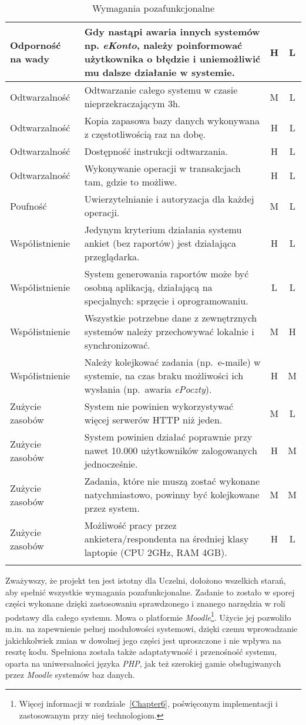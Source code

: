 \begin{center}
\begin{longtable}{ | p{4cm} | p{9cm} | c | c | }
%
Odporność na wady & Gdy nastąpi awaria innych systemów np. \textit{eKonto}, należy poinformować użytkownika o błędzie i uniemożliwić mu dalsze działanie w systemie. & H & L \\ \hline
%
Odtwarzalność & Odtwarzanie całego systemu w czasie nieprzekraczającym 3h. & M & L \\ \hline
Odtwarzalność & Kopia zapasowa bazy danych wykonywana z częstotliwością raz na dobę. & H & L \\ \hline
Odtwarzalność & Dostępność instrukcji odtwarzania. & H & L \\ \hline
Odtwarzalność & Wykonywanie operacji w transakcjach tam, gdzie to możliwe. & H & L \\ \hline
%
Poufność & Uwierzytelnianie i autoryzacja dla każdej operacji. & M & L \\ \hline
%
Współistnienie & Jedynym kryterium działania systemu ankiet (bez raportów) jest działająca przeglądarka. & H & L \\ \hline
Współistnienie & System generowania raportów może być osobną aplikacją, działającą na specjalnych: sprzęcie i oprogramowaniu. & L & L \\ \hline
Współistnienie & Wszystkie potrzebne dane z zewnętrznych systemów należy przechowywać lokalnie i synchronizować. & M & H \\ \hline
Współistnienie & Należy kolejkować zadania (np.~e-maile) w systemie, na czas braku możliwości ich wysłania (np.~awaria \textit{ePoczty}). & H & M \\ \hline
%
Zużycie zasobów & System nie powinien wykorzystywać więcej serwerów HTTP niż jeden. & M & L \\ \hline
Zużycie zasobów & System powinien działać poprawnie przy nawet 10.000 użytkowników zalogowanych jednocześnie. & H & M \\ \hline
Zużycie zasobów & Zadania, które nie muszą zostać wykonane natychmiastowo, powinny być kolejkowane przez system. & M & M \\ \hline
Zużycie zasobów & Możliwość pracy przez ankietera\slash respondenta na średniej klasy laptopie (CPU 2GHz, RAM 4GB). & H & L \\ \hline
%
\caption{Wymagania pozafunkcjonalne}\label{tab:reqs}
\end{longtable}
\end{center}

Zważywszy, że projekt ten jest istotny dla Uczelni, dołożono wszelkich starań, aby spełnić wszystkie wymagania pozafunkcjonalne. Zadanie to zostało w sporej części wykonane dzięki zastosowaniu sprawdzonego i znanego narzędzia w roli podstawy dla całego systemu. Mowa o platformie \textit{Moodle}\footnote{Więcej informacji w rozdziale~\ref{Chapter6}, poświęconym implementacji i zastosowanym przy niej technologiom.}. Użycie jej pozwoliło m.in. na zapewnienie pełnej modułowości systemowi, dzięki czemu wprowadzanie jakichkolwiek zmian w dowolnej jego części jest uproszczone i nie wpływa na resztę kodu. Spełniona została także adaptatywność i przenośność systemu, oparta na uniwersalności języka \textit{PHP}, jak też szerokiej gamie obsługiwanych przez \textit{Moodle} systemów baz danych. \\

